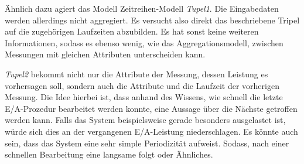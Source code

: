 \documentclass[
	12pt,
	a4paper,
	BCOR10mm,
	DIV14,
	listof=totoc,
	bibliography=totoc,
	headsepline
]{scrreprt}
\begin{document}
Ähnlich dazu agiert das Modell Zeitreihen-Modell \textit{Tupel1}. Die Eingabedaten werden allerdings nicht aggregiert. Es versucht also direkt das beschriebene Tripel auf die zugehörigen Laufzeiten abzubilden. Es hat sonst keine weiteren Informationen, sodass es ebenso wenig, wie das Aggregationsmodell, zwischen Messungen mit gleichen Attributen unterscheiden kann.

\textit{Tupel2} bekommt nicht nur die Attribute der Messung, dessen Leistung es vorhersagen soll, sondern auch die Attribute und die Laufzeit der vorherigen Messung. Die Idee hierbei ist, dass anhand des Wissens, wie schnell die letzte E/A-Prozedur bearbeitet werden konnte, eine Aussage über die Nächste getroffen werden kann. Falls das System beispielsweise gerade besonders ausgelastet ist, würde sich dies an der vergangenen E/A-Leistung niederschlagen. Es könnte auch sein, dass das System eine sehr simple Periodizität aufweist. Sodass, nach einer schnellen Bearbeitung eine langsame folgt oder Ähnliches.
\end{document}
